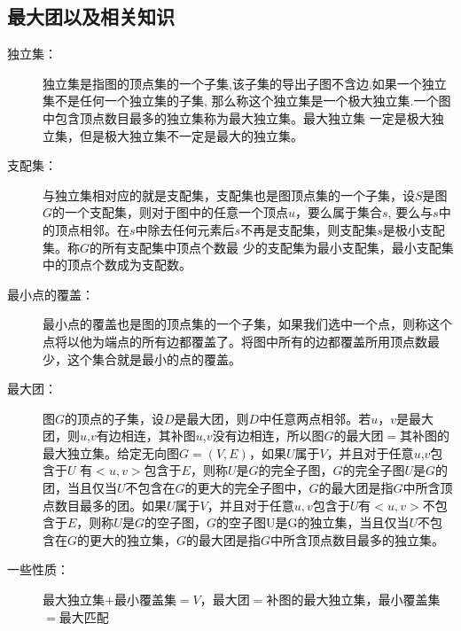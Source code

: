 \subsection{最大团以及相关知识}
    \begin{description}
	\item[独立集：] 独立集是指图的顶点集的一个子集,该子集的导出子图不含边.如果一个独立集不是任何一个独立集的子集, 那么称这个独立集是一个极大独立集.一个图中包含顶点数目最多的独立集称为最大独立集。最大独立集 一定是极大独立集，但是极大独立集不一定是最大的独立集。
	\item[支配集：] 与独立集相对应的就是支配集，支配集也是图顶点集的一个子集，设$S$是图$G$的一个支配集，则对于图中的任意一个顶点$u$，要么属于集合$s$, 要么与$s$中的顶点相邻。在$s$中除去任何元素后$s$不再是支配集，则支配集$s$是极小支配集。称$G$的所有支配集中顶点个数最 少的支配集为最小支配集，最小支配集中的顶点个数成为支配数。
	\item[最小点的覆盖：] 最小点的覆盖也是图的顶点集的一个子集，如果我们选中一个点，则称这个点将以他为端点的所有边都覆盖了。将图中所有的边都覆盖所用顶点数最少，这个集合就是最小的点的覆盖。
	\item[最大团：] 图$G$的顶点的子集，设$D$是最大团，则$D$中任意两点相邻。若$u$，$v$是最大团，则$u$,$v$有边相连，其补图$u$,$v$没有边相连，所以图$G$的最大团$=$其补图的最大独立集。给定无向图$G=(V,E)$，如果$U$属于$V$，并且对于任意$u$,$v$包含于$U$ 有$<u,v>$包含于$E$，则称$U$是$G$的完全子图，$G$的完全子图$U$是$G$的团，当且仅当$U$不包含在$G$的更大的完全子图中，$G$的最大团是指$G$中所含顶点数目最多的团。如果$U$属于$V$，并且对于任意$u,v$包含于$U$有$<u,v>$不包含于$E$，则称$U$是$G$的空子图，$G$的空子图U是G的独立集，当且仅当$U$不包含在$G$的更大的独立集，$G$的最大团是指$G$中所含顶点数目最多的独立集。
	\item[一些性质：] 最大独立集$+$最小覆盖集$=V$，最大团$=$补图的最大独立集，最小覆盖集$=$最大匹配
    \end{description}
    
